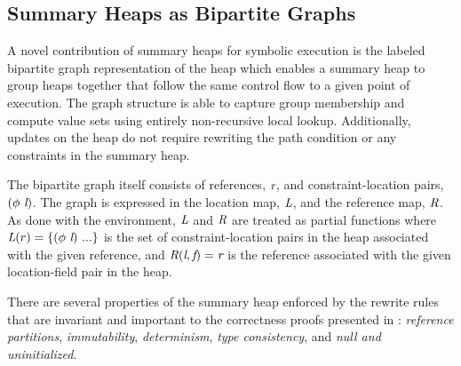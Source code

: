 \subsection{Summary Heaps as Bipartite Graphs}
A novel contribution of summary heaps for symbolic execution is the
labeled bipartite graph representation of the heap which enables a
summary heap to group heaps together that follow the same control flow
to a given point of execution. The graph structure is able to capture
group membership and compute value sets using entirely non-recursive
local lookup. Additionally, updates on the heap do not require
rewriting the path condition or any constraints in the summary heap.

The bipartite graph itself consists of references, $\emph{r}$, and
constraint-location pairs, $(\phi\ \emph{l})$. The graph is
expressed in the location map, $\emph{L}$, and the reference map,
$\emph{R}$. As done with the environment, $\emph{L}$ and $\emph{R}$
are treated as partial functions where $\emph{L}(r) =
\{(\phi\ \emph{l})\ ...\}$ is the set of constraint-location pairs in
the heap associated with the given reference, and
$\emph{R}(\emph{l},\emph{f}) = \emph{r}$ is the reference
associated with the given location-field pair in the heap.  

There are several properties of the summary heap enforced by the
rewrite rules that are invariant and important to the correctness
proofs presented in : \emph{reference partitions},
\emph{immutability}, \emph{determinism}, \emph{type
  consistency}, and \emph{null and uninitialized}.

